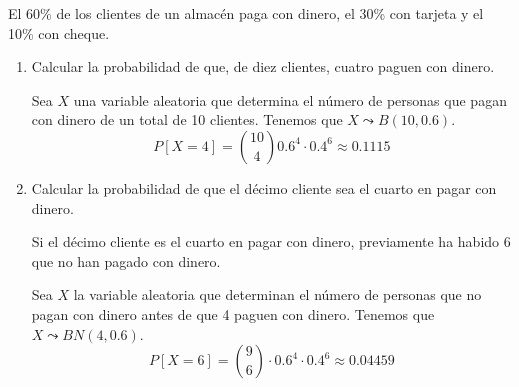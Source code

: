 \begin{ejercicio}
    El 60\% de los clientes de un almacén paga con dinero, el 30\% con tarjeta y el 10\% con cheque.
    \begin{enumerate}
        \item Calcular la probabilidad de que, de diez clientes, cuatro paguen con dinero.

        Sea $X$ una variable aleatoria que determina el número de personas que pagan con dinero de un total de 10 clientes. Tenemos que $X\leadsto B(10, 0.6)$.
        \begin{equation*}
            P[X=4]=\binom{10}{4}0.6^4\cdot 0.4^6 \approx 0.1115
        \end{equation*}
        
        \item Calcular la probabilidad de que el décimo cliente sea el cuarto en pagar con dinero.

        Si el décimo cliente es el cuarto en pagar con dinero, previamente ha habido 6 que no han pagado con dinero.

        Sea $X$ la variable aleatoria que determinan el número de personas que no pagan con dinero antes de que 4 paguen con dinero. Tenemos que $X\leadsto BN(4, 0.6)$.
        \begin{equation*}
            P[X=6]=\binom{9}{6}\cdot 0.6^4\cdot 0.4^6 \approx 0.04459
        \end{equation*}

        
    \end{enumerate}
\end{ejercicio}



